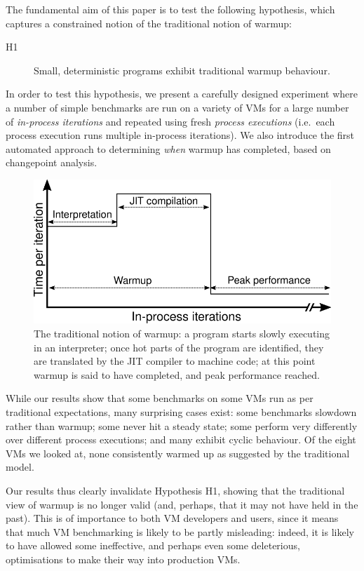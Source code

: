 \documentclass[preprint,numbers,10pt]{sigplanconf}
\newcommand{\hypone}{H1\xspace}
\begin{document}
The fundamental aim of this paper is to test the following hypothesis, which captures a constrained
notion of the traditional notion of warmup:
\begin{description}
  \item[\hypone] Small, deterministic programs exhibit traditional warmup behaviour.
\end{description}
In order to test this hypothesis, we present a carefully designed
experiment where a number of simple benchmarks are run on a variety of
VMs for a large number of \emph{in-process iterations} and repeated using fresh
\emph{process executions} (i.e.~each process execution runs multiple in-process
iterations). We also introduce the first automated approach to determining
\emph{when} warmup has completed, based on changepoint analysis.

\begin{figure}[t]
\centering
\includegraphics[width=.475\textwidth]{img/picturebook_warmup}
\caption{The traditional notion of warmup: a program starts slowly executing in
an interpreter; once hot parts of the program are identified, they are
translated by the JIT compiler to machine code; at this point warmup
is said to have completed, and peak performance reached.}
\label{fig:trad}
\end{figure}

While our results show that some benchmarks on some VMs run as per traditional
expectations, many surprising cases exist: some benchmarks slowdown rather than
warmup; some never hit a steady state; some perform very differently over
different process executions; and many exhibit cyclic behaviour. Of the eight
VMs we looked at, none consistently warmed up as suggested by the traditional model.

Our results thus clearly invalidate Hypothesis H1, showing that the traditional
view of warmup is no longer valid (and, perhaps, that it may not have held in
the past). This is of importance to both VM developers and users, since it means
that much VM benchmarking is likely to be partly misleading: indeed, it is
likely to have allowed some ineffective, and perhaps even some deleterious,
optimisations to make their way into production VMs.
\end{document}
